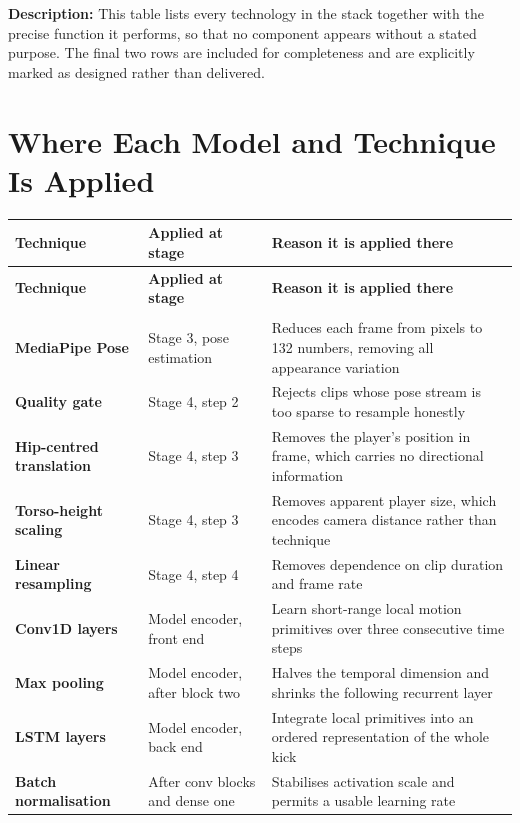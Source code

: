 \noindent
\textbf{Description:} This table lists every technology in the stack together with the precise function it performs, so that no component appears without a stated purpose. The final two rows are included for completeness and are explicitly marked as designed rather than delivered.

\section{Where Each Model and Technique Is Applied}

\renewcommand{\arraystretch}{1.25}
\small
\begin{longtable}{|>{\bfseries}p{3.6cm}|p{3.4cm}|p{6.0cm}|}
\hline
\textbf{Technique} & \textbf{Applied at stage} & \textbf{Reason it is applied there} \\ \hline
\endfirsthead
\hline
\textbf{Technique} & \textbf{Applied at stage} & \textbf{Reason it is applied there} \\ \hline
\endhead
\hline
\multicolumn{3}{r}{\textit{Continued on next page}} \\
\hline
\endfoot
\hline
\endlastfoot
MediaPipe Pose & Stage 3, pose estimation & Reduces each frame from pixels to 132 numbers, removing all appearance variation \\ \hline
Quality gate & Stage 4, step 2 & Rejects clips whose pose stream is too sparse to resample honestly \\ \hline
Hip-centred translation & Stage 4, step 3 & Removes the player's position in frame, which carries no directional information \\ \hline
Torso-height scaling & Stage 4, step 3 & Removes apparent player size, which encodes camera distance rather than technique \\ \hline
Linear resampling & Stage 4, step 4 & Removes dependence on clip duration and frame rate \\ \hline
Conv1D layers & Model encoder, front end & Learn short-range local motion primitives over three consecutive time steps \\ \hline
Max pooling & Model encoder, after block two & Halves the temporal dimension and shrinks the following recurrent layer \\ \hline
LSTM layers & Model encoder, back end & Integrate local primitives into an ordered representation of the whole kick \\ \hline
Batch normalisation & After conv blocks and dense one & Stabilises activation scale and permits a usable learning rate \\ \hline

\end{longtable}
